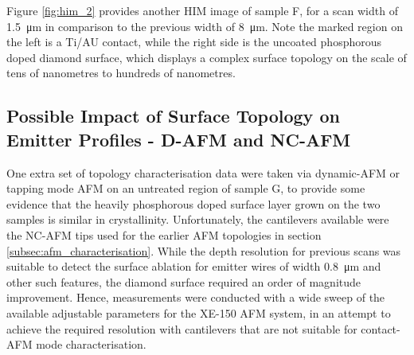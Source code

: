 \begin{refsection}
Figure \ref{fig:him_2} provides another HIM image of sample F, for a scan width of 1.5~\si{\micro\metre} in comparison to the previous width of 8~\si{\micro\metre}. Note the marked region on the left is a Ti/AU contact, while the right side is the uncoated phosphorous doped diamond surface, which displays a complex surface topology on the scale of tens of nanometres to hundreds of nanometres.

\subsection{Possible Impact of Surface Topology on Emitter Profiles - D-AFM and NC-AFM}
One extra set of topology characterisation data were taken via dynamic-AFM or tapping mode AFM on an untreated region of sample G, to provide some evidence that the heavily phosphorous doped surface layer grown on the two samples is similar in crystallinity. Unfortunately, the cantilevers available were the NC-AFM tips used for the earlier AFM topologies in section \ref{subsec:afm_characterisation}. While the depth resolution for previous scans was suitable to detect the surface ablation for emitter wires of width 0.8~\si{\micro\metre} and other such features, the diamond surface required an order of magnitude improvement. Hence, measurements were conducted with a wide sweep of the available adjustable parameters for the XE-150 AFM system, in an attempt to achieve the required resolution with cantilevers that are not suitable for contact-AFM mode characterisation.


\end{refsection}

